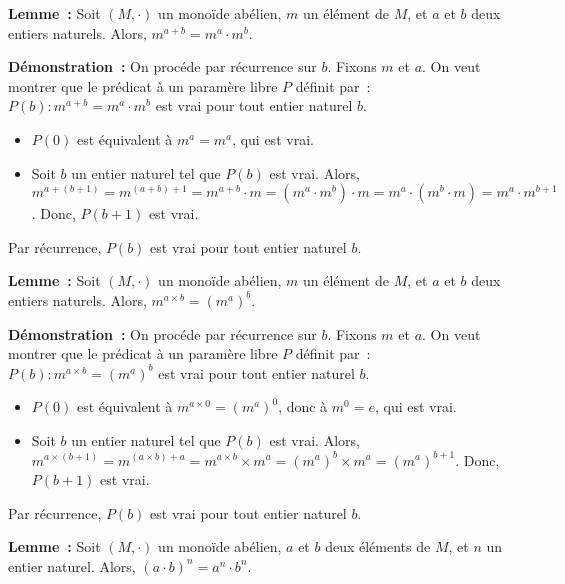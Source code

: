 \medskip

\noindent\textbf{Lemme :} Soit $(M,\cdot)$ un monoïde abélien, $m$ un élément de $M$, et $a$ et $b$ deux entiers naturels. 
    Alors, $m^{a + b} = m^a \cdot m^b$.

\medskip

\noindent\textbf{Démonstration :} On procéde par récurrence sur $b$.
    Fixons $m$ et $a$.
    On veut montrer que le prédicat à un paramère libre $P$ définit par : $P(b): m^{a+b} = m^a \cdot m^b$ est vrai pour tout entier naturel $b$.
    \begin{itemize}[nosep]
        \item $P(0)$ est équivalent à $m^a = m^a$, qui est vrai.
        \item Soit $b$ un entier naturel tel que $P(b)$ est vrai. 
            Alors, $m^{a+(b+1)} = m^{(a+b)+1} = m^{a+b} \cdot m = (m^a \cdot m^b) \cdot m = m^a \cdot (m^b \cdot m) = m^a \cdot m^{b+1}$.
            Donc, $P(b+1)$ est vrai.
    \end{itemize}
    Par récurrence, $P(b)$ est vrai pour tout entier naturel $b$.

    \done

\medskip

\noindent\textbf{Lemme :} Soit $(M,\cdot)$ un monoïde abélien, $m$ un élément de $M$, et $a$ et $b$ deux entiers naturels. 
    Alors, $m^{a \times b} = (m^a)^b$.

\medskip

\noindent\textbf{Démonstration :} On procéde par récurrence sur $b$.
    Fixons $m$ et $a$.
    On veut montrer que le prédicat à un paramère libre $P$ définit par : $P(b): m^{a \times b} = (m^a)^b$ est vrai pour tout entier naturel $b$.
    \begin{itemize}[nosep]
        \item $P(0)$ est équivalent à $m^{a \times 0} = (m^a)^0$, donc à $m^0 = e$, qui est vrai.
        \item Soit $b$ un entier naturel tel que $P(b)$ est vrai. 
            Alors, $m^{a \times (b+1)} = m^{(a \times b) + a} = m^{a \times b} \times m^a = (m^a)^b \times m^a = (m^a)^{b+1}$.
            Donc, $P(b+1)$ est vrai.
    \end{itemize}
    Par récurrence, $P(b)$ est vrai pour tout entier naturel $b$.

    \done

\medskip

\noindent\textbf{Lemme :} Soit $(M, \cdot)$ un monoïde abélien, $a$ et $b$ deux éléments de $M$, et $n$ un entier naturel. 
    Alors, $(a \cdot b)^n = a^n \cdot b^n$.

